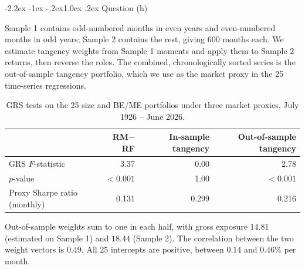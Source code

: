 \documentclass[11pt]{article}
\makeatletter
\renewcommand\subsection{\@startsection{subsection}{2}{0pt}%
  {-2.2ex \@plus -1ex \@minus -.2ex}{1.0ex \@plus .2ex}%
  {\normalfont\bfseries\normalsize\color{psink}}}
\makeatother
\begin{document}
\subsection{Question (h)}

Sample 1 contains odd-numbered months in even years and even-numbered months
in odd years; Sample 2 contains the rest, giving 600 months each. We estimate
tangency weights from Sample 1 moments and apply them to Sample 2 returns,
then reverse the roles. The combined, chronologically sorted series is the
out-of-sample tangency portfolio, which we use as the market proxy in the 25
time-series regressions.

\begin{table}[H]
\centering
\caption{GRS tests on the 25 size and BE/ME portfolios under three market
proxies, July 1926 -- June 2026.}
\small
\begin{tabular}{lrrr}
\toprule
& RM$-$RF & In-sample tangency & Out-of-sample tangency \\
\midrule
GRS $F$-statistic & 3.37 & 0.00 & 2.78 \\
$p$-value & $<0.001$ & 1.00 & $<0.001$ \\
Proxy Sharpe ratio (monthly) & 0.131 & 0.299 & 0.216 \\
\bottomrule
\end{tabular}
\label{tab:p3h}
\vspace{2pt}\begin{minipage}{0.93\textwidth}\footnotesize
Out-of-sample weights sum to one in each half, with gross exposure $14.81$
(estimated on Sample 1) and $18.44$ (Sample 2). The correlation between the
two weight vectors is $0.49$. All 25 intercepts are positive, between $0.14$
and $0.46\%$ per month.
\end{minipage}
\end{table}
\end{document}

